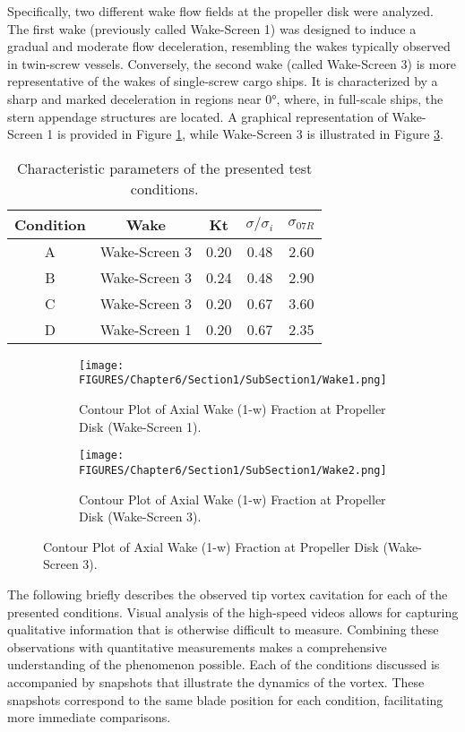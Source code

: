 Specifically, two different wake flow fields at the propeller disk were analyzed. The first wake (previously called Wake-Screen 1) was designed to induce a gradual and moderate flow deceleration, resembling the wakes typically observed in twin-screw vessels. Conversely, the second wake (called Wake-Screen 3) is more representative of the wakes of single-screw cargo ships. It is characterized by a sharp and marked deceleration in regions near 0°, where, in full-scale ships, the stern appendage structures are located.
A graphical representation of Wake-Screen 1 is provided in Figure \ref{fig:Wake1}, while Wake-Screen 3 is illustrated in Figure \ref{fig:Wake2}.

\begin{table}[htbp]
    \centering
    \begin{tabular}{ccccc} %
        Condition & Wake & Kt & $\sigma/\sigma_i$ & $\sigma_{07 R}$ \\ \hline
        A & Wake-Screen 3 & 0.20 & 0.48 & 2.60 \\ 
        B & Wake-Screen 3 & 0.24 & 0.48 & 2.90 \\ 
        C & Wake-Screen 3 & 0.20 & 0.67 & 3.60 \\ 
        D & Wake-Screen 1 & 0.20 & 0.67 & 2.35 \\ 
    \end{tabular}
    \caption{Characteristic parameters of the presented test conditions.}
    \label{tab:PresentedConditions}
\end{table}

\begin{figure}[htbp!]
    \centering
    \begin{subfigure}{0.45\textwidth}
        \texttt{[image: FIGURES/Chapter6/Section1/SubSection1/Wake1.png]}
        \caption{Contour Plot of Axial Wake (1-w) Fraction at Propeller Disk (Wake-Screen 1).}
        \label{fig:Wake1}
    \end{subfigure}
    \hfill
    \begin{subfigure}{0.45\textwidth}
        \texttt{[image: FIGURES/Chapter6/Section1/SubSection1/Wake2.png]}
        \caption{Contour Plot of Axial Wake (1-w) Fraction at Propeller Disk (Wake-Screen 3).}
        \label{fig:Wake2}
    \end{subfigure}
\end{figure}

The following briefly describes the observed tip vortex cavitation for each of the presented conditions. Visual analysis of the high-speed videos allows for capturing qualitative information that is otherwise difficult to measure. Combining these observations with quantitative measurements makes a comprehensive understanding of the phenomenon possible.
Each of the conditions discussed is accompanied by snapshots that illustrate the dynamics of the vortex. These snapshots correspond to the same blade position for each condition, facilitating more immediate comparisons.

